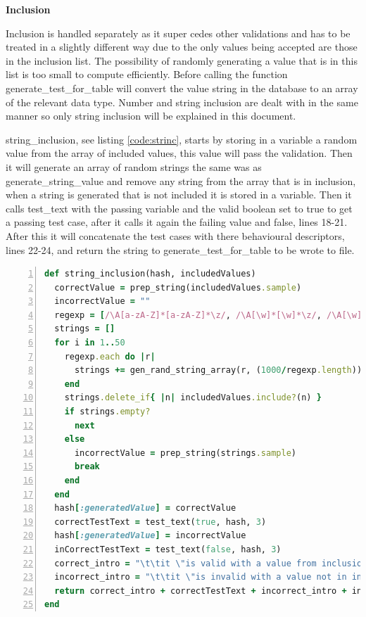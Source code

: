 \documentclass[a4paper,12pt]{article}
\begin{document}
\par \textbf{Inclusion}
\par Inclusion is handled separately as it super cedes other validations and has to be treated in a slightly different way due to the only values being accepted are those in the inclusion list. The possibility of randomly generating a value that is in this list is too small to compute efficiently. Before calling the function generate\_test\_for\_table will convert the value string in the database to an array of the relevant data type. Number and string inclusion are dealt with in the same manner so only string inclusion will be explained in this document. 
\vspace{3mm}
\par string\_inclusion, see listing \ref{code:strinc}, starts by storing in a variable a random value from the array of included values, this value will pass the validation. Then it will generate an array of random strings the same was as generate\_string\_value and remove any string from the array that is in inclusion, when a string is generated that is not included it is stored in a variable. Then it calls test\_text with the passing variable and the valid boolean set to true to get a passing test case, after it calls it again the failing value and false, lines 18-21. After this it will concatenate the test cases with there behavioural descriptors, lines 22-24, and return the string to generate\_test\_for\_table to be wrote to file.

\begin{lstlisting}[frame=single,numbers=left,language = ruby,caption= {generate\_tests\_for\_table}, label={code:strinc}]
def string_inclusion(hash, includedValues)
  correctValue = prep_string(includedValues.sample)
  incorrectValue = ""
  regexp = [/\A[a-zA-Z]*[a-zA-Z]*\z/, /\A[\w]*[\w]*\z/, /\A[\w]*[[:punct:]]*[\w]*\z/, /\A[\w]*[[:print:]]*[a-zA-Z]*\z/]
  strings = []
  for i in 1..50
    regexp.each do |r|
      strings += gen_rand_string_array(r, (1000/regexp.length))
    end
    strings.delete_if{ |n| includedValues.include?(n) }
    if strings.empty?
      next
    else
      incorrectValue = prep_string(strings.sample)
      break
    end
  end
  hash[:generatedValue] = correctValue
  correctTestText = test_text(true, hash, 3)
  hash[:generatedValue] = incorrectValue
  inCorrectTestText = test_text(false, hash, 3)
  correct_intro = "\t\tit \"is valid with a value from inclusion\" do\n"
  incorrect_intro = "\t\tit \"is invalid with a value not in inclusion\" do\n"
  return correct_intro + correctTestText + incorrect_intro + inCorrectTestText 
end
\end{lstlisting}
\end{document}

